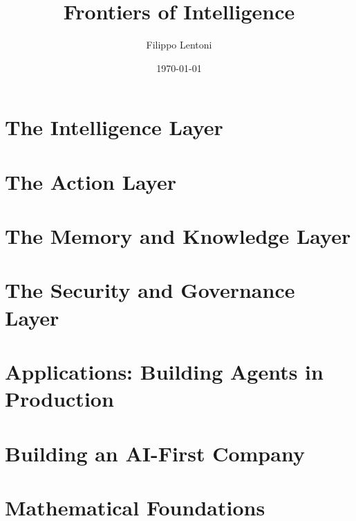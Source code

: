 \documentclass[11pt,oneside]{book}
\title{Frontiers of Intelligence}
\author{Filippo Lentoni}
\date{\today}
\begin{document}
\frontmatter
\maketitle
\tableofcontents

\mainmatter




\part{The Intelligence Layer}




\part{The Action Layer}



\part{The Memory and Knowledge Layer}


\part{The Security and Governance Layer}


\part{Applications: Building Agents in Production}




\part{Building an AI-First Company}


\part{Mathematical Foundations}




\backmatter
\end{document}
